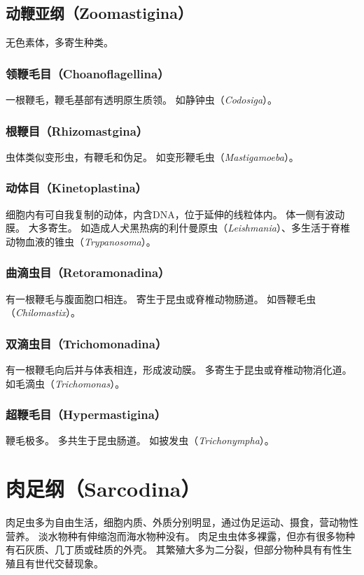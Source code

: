 \documentclass[11pt]{article}
\begin{document}
\subsection{动鞭亚纲（Zoomastigina）}
无色素体，多寄生种类。

\subsubsection{领鞭毛目（Choanoflagellina）}
一根鞭毛，鞭毛基部有透明原生质领。
如静钟虫（\textit{Codosiga}）。

\subsubsection{根鞭目（Rhizomastgina）}
虫体类似变形虫，有鞭毛和伪足。
如变形鞭毛虫（\textit{Mastigamoeba}）。

\subsubsection{动体目（Kinetoplastina）}
细胞内有可自我复制的动体，内含DNA，位于延伸的线粒体内。
体一侧有波动膜。
大多寄生。
如造成人犬黑热病的利什曼原虫（\textit{Leishmania}）、多生活于脊椎动物血液的锥虫（\textit{Trypanosoma}）。

\subsubsection{曲滴虫目（Retoramonadina）}
有一根鞭毛与腹面胞口相连。
寄生于昆虫或脊椎动物肠道。
如唇鞭毛虫（\textit{Chilomastix}）。

\subsubsection{双滴虫目（Trichomonadina）}
有一根鞭毛向后并与体表相连，形成波动膜。
多寄生于昆虫或脊椎动物消化道。
如毛滴虫（\textit{Trichomonas}）。

\subsubsection{超鞭毛目（Hypermastigina）}
鞭毛极多。
多共生于昆虫肠道。
如披发虫（\textit{Trichonympha}）。


\section{肉足纲（Sarcodina）}
肉足虫多为自由生活，细胞内质、外质分别明显，通过伪足运动、摄食，营动物性营养。
淡水物种有伸缩泡而海水物种没有。
肉足虫虫体多裸露，但亦有很多物种有石灰质、几丁质或硅质的外壳。
其繁殖大多为二分裂，但部分物种具有有性生殖且有世代交替现象。
\end{document}
